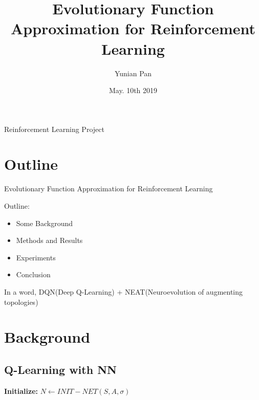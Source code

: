 \documentclass{beamer}
\title[Evolutionary Function Approximation for Reinforcement Learning]{Evolutionary Function Approximation for Reinforcement Learning}
\author{Yunian Pan}
\institute{ECE department}
\date{May. 10th 2019}
\begin{document}
\begin{frame}{Reinforcement Learning Project}
  \titlepage
\end{frame}


\section{Outline}

\begin{frame}{Evolutionary Function Approximation for Reinforcement Learning}
\begin{block}{Outline:}
\begin{itemize}
  \item Some Background
  \item Methods and Results
  \item Experiments
  \item Conclusion
\end{itemize}
\end{block}
\vskip 1cm

\begin{block}{}
  In a word, DQN(Deep Q-Learning) + NEAT(Neuroevolution of augmenting topologies)
 \end{block}

\end{frame}

\section{Background}

\subsection{Q-Learning with NN}
\begin{frame}{}
  \footnotesize
  \begin{algorithm}[H]
    \scriptsize
    \caption{Q-Learning}
    \textbf{Initialize:} $N \leftarrow INIT-NET(S,A,\sigma)$ \;    
    \end{algorithm}

  
\end{frame}
\end{document}
